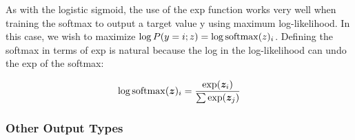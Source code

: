 \begin{multicols}{2}
	As with the logistic sigmoid, the use of the exp function works very well when training the softmax to output a target value y using maximum log-likelihood. In this case, we wish to maximize $\log P(y = i; z) = \log \mathrm{softmax}(z)_i$. Defining the softmax in terms of exp is natural because the log in the log-likelihood can undo the exp of the softmax:
	
	\[ \log \mathrm{softmax}({\bm{z}})_{i} = \frac{\exp({\bm{z}}_{i})}{\sum \exp({\bm{z}}_{j})} \]
	

	\subsubsection{Other Output Types}
	\newpage
\end{multicols}




































